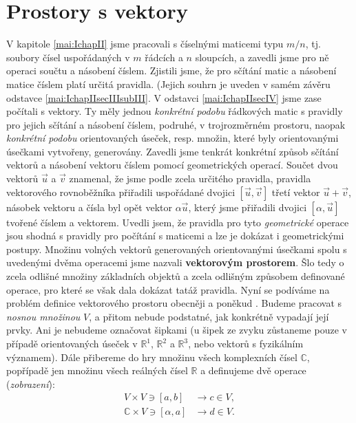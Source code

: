   \section{Prostory s vektory}\label{mai:IIchapIsecI}
    V kapitole \ref{mai:IchapII} jsme pracovali s číselnými maticemi typu \(m/n\), tj. soubory 
    čísel uspořádaných v \(m\) řádcích a \(n\) sloupcích, a zavedli jsme pro ně operaci součtu a 
    násobení číslem. Zjistili jsme, že pro sčítání matic a násobení matice číslem platí určitá 
    pravidla. (Jejich souhrn je uveden v samém závěru odstavce \ref{mai:IchapIIsecIIIsubIII}. V 
    odstavci \ref{mai:IchapIIsecIV} jsme zase počítali s vektory. Ty měly jednou \emph{konkrétní 
    podobu} řádkových matic s pravidly pro jejich sčítání a násobení číslem, podruhé, v 
    trojrozměrném prostoru, naopak \emph{konkrétní podobu} orientovaných úseček, resp. množin, 
    které byly orientovanými úsečkami vytvořeny, generovány. Zavedli jsme tenkrát konkrétní způsob 
    sčítání vektorů a násobení vektoru číslem pomocí geometrických operací. Součet dvou vektorů 
    \(\vec{u}\) a \(\vec{v}\) znamenal, že jsme podle zcela určitého pravidla, pravidla 
    vektorového rovnoběžníka přiřadili uspořádané dvojici \([\vec{u},\vec{v}]\) třetí vektor 
    \(\vec{u} + \vec{v}\), násobek vektoru a čísla byl opět vektor \(\alpha\vec{u}\), který jsme 
    přiřadili dvojici \([\alpha,\vec{u}]\) tvořené číslem a vektorem. Uvedli jsem, že pravidla pro 
    tyto \emph{geometrické} operace jsou shodná s pravidly pro počítání s maticemi a lze je dokázat 
    i geometrickými postupy. Množinu volných vektorů generovaných orientovanými úsečkami spolu s 
    uvedenými dvěma operacemi jsme nazvali \textbf{vektorovým prostorem}. Šlo tedy o zcela odlišné 
    množiny základních objektů a zcela odlišným způsobem definované operace, pro které se však dala 
    dokázat tatáž pravidla. Nyní se podíváme na problém definice vektorového prostoru obecněji a 
    poněkud . Budeme pracovat s \emph{nosnou množinou} \(V\), a přitom nebude podstatné, 
    jak konkrétně vypadají její prvky. Ani je nebudeme označovat šipkami (u šipek ze zvyku 
    zůstaneme pouze v případě orientovaných úseček v \(\mathbb{R}^1\), \(\mathbb{R}^2\) a 
    \(\mathbb{R}^3\), nebo vektorů s fyzikálním významem). Dále přibereme do hry množinu všech 
    komplexních čísel \(\mathbb{C}\), popřípadě jen množinu všech reálných čísel \(\mathbb{R}\) a 
    definujeme dvě operace (\emph{zobrazení}):
    \begin{subequations}\label{mai:eq046}
      \begin{align}
        V \times V \ni [a,b]            &\longrightarrow c\in V, \label{mai:eq046a}  \\
        \mathbb{C}\times V\ni[\alpha,a] &\longrightarrow d\in V. \label{mai:eq046b}
      \end{align}
    \end{subequations}

